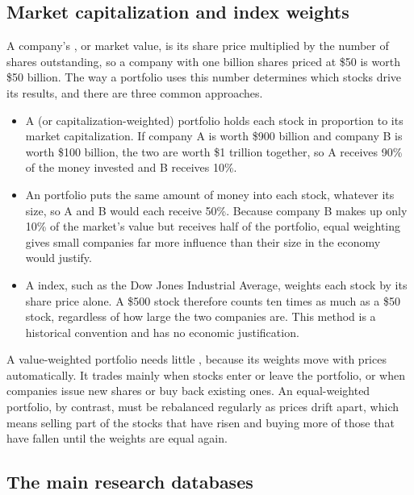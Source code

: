 \subsection{Market capitalization and index weights}

A company's , or market value, is its share price multiplied by the number of shares outstanding, so a company with one billion shares priced at \$50 is worth \$50 billion. The way a portfolio uses this number determines which stocks drive its results, and there are three common approaches.

\begin{itemize}
  \item A  (or capitalization-weighted) portfolio holds each stock in proportion to its market capitalization. If company A is worth \$900 billion and company B is worth \$100 billion, the two are worth \$1 trillion together, so A receives 90\% of the money invested and B receives 10\%.
  \item An  portfolio puts the same amount of money into each stock, whatever its size, so A and B would each receive 50\%. Because company B makes up only 10\% of the market's value but receives half of the portfolio, equal weighting gives small companies far more influence than their size in the economy would justify.
  \item A  index, such as the Dow Jones Industrial Average, weights each stock by its share price alone. A \$500 stock therefore counts ten times as much as a \$50 stock, regardless of how large the two companies are. This method is a historical convention and has no economic justification.
\end{itemize}

A value-weighted portfolio needs little , because its weights move with prices automatically. It trades mainly when stocks enter or leave the portfolio, or when companies issue new shares or buy back existing ones. An equal-weighted portfolio, by contrast, must be rebalanced regularly as prices drift apart, which means selling part of the stocks that have risen and buying more of those that have fallen until the weights are equal again.


\subsection{The main research databases}

